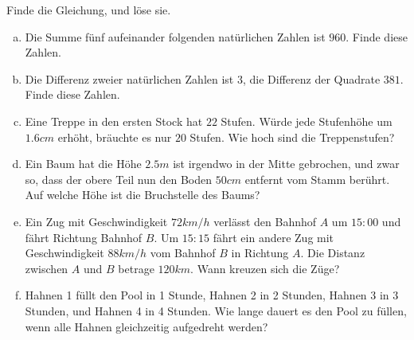 \documentclass[%
11pt,%
twoside,%
titlepage,%
german,%
headsepline%
]{scrartcl}
\begin{document}
\begin{ueb} Finde die Gleichung, und löse sie.
                \begin{enumerate}[a)]
                                \item Die Summe fünf aufeinander folgenden natürlichen Zahlen ist $960$. Finde diese Zahlen.
                                \item Die Differenz zweier natürlichen Zahlen ist $3$, die Differenz der Quadrate $381$. Finde diese Zahlen.
                                \item Eine Treppe in den ersten Stock hat $22$ Stufen. Würde jede Stufenhöhe um $1.6 cm$ erhöht, bräuchte es nur $20$ Stufen. Wie hoch sind die Treppenstufen?
                                \item Ein Baum hat die Höhe $2.5 m$ ist irgendwo in der Mitte gebrochen, und zwar so, dass der obere Teil nun den Boden $50 cm$ entfernt vom Stamm berührt. Auf welche Höhe ist die Bruchstelle des Baums?
                                \item Ein Zug mit Geschwindigkeit $72 km/h$ verlässt den Bahnhof $A$ um $15:00$ und fährt Richtung Bahnhof $B$. Um $15:15$ fährt ein andere Zug mit Geschwindigkeit $88km/h$ vom Bahnhof $B$ in Richtung $A$. Die Distanz zwischen $A$ und $B$ betrage $120 km$. Wann kreuzen sich die Züge?
                                \item Hahnen 1 füllt den Pool in 1 Stunde, Hahnen 2 in 2 Stunden, Hahnen 3 in 3 Stunden, und Hahnen 4 in 4 Stunden. Wie lange dauert es den Pool zu füllen, wenn alle Hahnen gleichzeitig aufgedreht werden?
                \end{enumerate}
\end{ueb}

\pagebreak 




\end{document}
